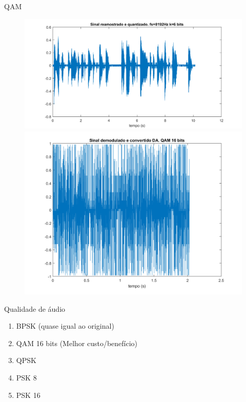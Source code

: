 ﻿\documentclass[mathserif]{beamer}
\begin{document}
	\begin{frame}{QAM}
		\begin{figure}
			\centering
			\includegraphics[scale=0.3]{../NossoCodigo2/figuras/0quantizado.png}
			\quad
			\includegraphics[scale=0.3]{../NossoCodigo2/figuras/modula18.png}
		\end{figure}
	\end{frame}

	\begin{frame}{Qualidade de áudio}
		\begin{enumerate}
		\item BPSK (quase igual ao original)
		\item QAM 16 bits (Melhor custo/benefício)
		\item QPSK
		\item PSK 8 
		\item PSK 16
		\end{enumerate}

	\end{frame}
	


	
\end{document}
